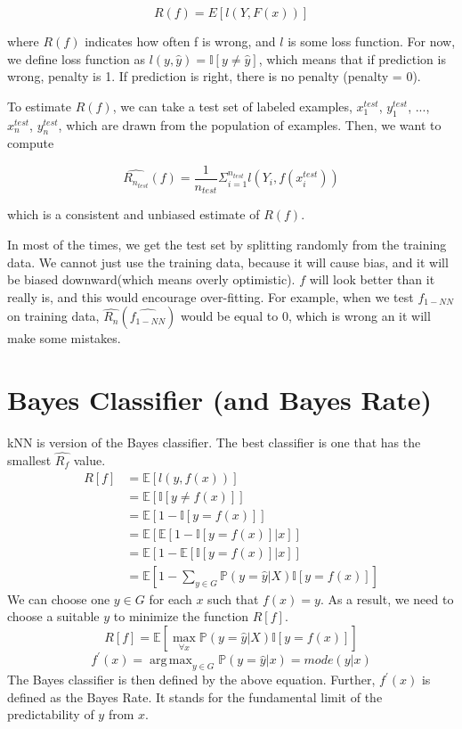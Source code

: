 \documentclass[a4paper]{article}
\DeclareMathOperator*{\argmax}{arg\,max}
\begin{document}
\[ R\left ( f \right )= E \left [ l \left ( Y, F\left ( x \right ) \right ) \right ] \]

where $R \left ( f \right )$ indicates how often f is wrong, and $l$ is some loss function. For now, we define loss function as $ l \left ( y,\widehat{y} \right ) = \mathbb{I} \left [ y\neq \widehat{y} \right ] $, which means that if prediction is wrong, penalty is 1. If prediction is right, there is no penalty (penalty = 0). 
\par To estimate $R\left(f\right)$, we can take a test set of labeled examples, $x_{1}^{test}$, $y_{1}^{test}$, ..., $x_{n}^{test}$, $y_{n}^{test}$, which are drawn from the population of examples. Then, we want to compute

\[\widehat{R_{n_{test}}}\left ( f \right )= \frac{1}{n_{test}}\Sigma _{i=1}^{n_{test}}l\left ( Y_{i}, f(x_{i}^{test}) \right ) \]

which is a consistent and unbiased estimate of $R\left(f \right)$.
\par In most of the times, we get the test set by splitting randomly from the training data. We cannot just use the training data, because it will cause bias, and it will be biased downward(which means overly optimistic). $f$ will look better than it really is, and this would encourage over-fitting. For example, when we test $f_{1-NN}$ on training data, $\widehat{R_{n}}(\widehat{f_{1-NN}})$ would be equal to 0, which is wrong an it will make some mistakes. 

\section{Bayes Classifier (and Bayes Rate)}

kNN is version of the Bayes classifier. The best classifier is one that has the smallest $\hat{R_f}$ value.
\begin{align*}
R[f] &= \mathbb{E}[l(y, f(x))] \\
&= \mathbb{E}[\mathbb{I}[y \neq f(x)]] \\
&= \mathbb{E}[1 - \mathbb{I}[y = f(x)]] \\
&= \mathbb{E}[\mathbb{E}[1 - \mathbb{I}[y = f(x)] \vert x]] \\
&= \mathbb{E}[1 - \mathbb{E}[\mathbb{I}[y = f(x)] \vert x]] \\
&= \mathbb{E}[1 - \sum_{y \in G} \mathbb{P}(y = \hat{y} \vert X)\mathbb{I}[y = f(x)]]
\end{align*}
We can choose one $y \in G$ for each $x$ such that $f(x) = y$. As a result, we need to choose a suitable $y$ to minimize the function $R[f]$.
\begin{equation*}
R[f] = \mathbb{E}[\max_{\forall x} \mathbb{P}(y = \hat{y} \vert X)\mathbb{I}[y = f(x)]]
\end{equation*}
\begin{equation*}
\boxed{f^\prime(x) = \argmax_{y \in G} \mathbb{P}(y = \hat{y} \vert x) = mode(y \vert x)}
\end{equation*}
The Bayes classifier is then defined by the above equation. Further, $f^\prime(x)$ is defined as the Bayes Rate. It stands for the fundamental limit of the predictability of $y$ from $x$.
\end{document}
